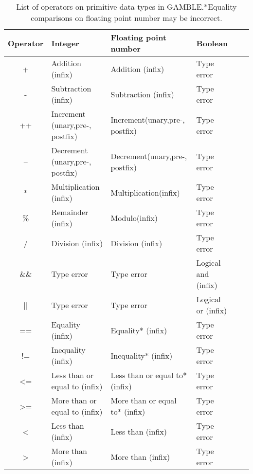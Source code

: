 \begin{table}[h]
    \centering
    \begin{tabular}{|c|l|l|l|l|l|}
    \hline
    \textbf{Operator}  & \textbf{Integer}                   & \textbf{Floating point number}    & \textbf{Boolean}       \\ \hline
    +                  & Addition (infix)                   & Addition (infix)                  & Type error             \\ \hline 
    -                  & Subtraction (infix)                & Subtraction (infix)               & Type error             \\ \hline 
    ++                 & Increment (unary,pre-, postfix)    & Increment(unary,pre-, postfix)    & Type error             \\ \hline    
    --                 & Decrement (unary,pre-, postfix)    & Decrement(unary,pre-, postfix)    & Type error             \\ \hline
    *                  & Multiplication (infix)             & Multiplication(infix)             & Type error             \\ \hline
    \%                 & Remainder (infix)                  & Modulo(infix)                     & Type error             \\ \hline
    /                  & Division (infix)                   & Division (infix)                  & Type error             \\ \hline
    \&\&               & Type error                         & Type error                        & Logical and (infix)    \\ \hline 
    ||                 & Type error                         & Type error                        & Logical or (infix)     \\ \hline 
    ==                 & Equality (infix)                   & Equality* (infix)                 & Type error             \\ \hline 
    !=                 & Inequality (infix)                 & Inequality* (infix)               & Type error             \\ \hline
    <=                 & Less than or equal to (infix)      & Less than or equal to* (infix)    & Type error             \\ \hline
    >=                 & More than or equal to (infix)      & More than or equal to* (infix)    & Type error             \\ \hline
    <                  & Less than (infix)                  & Less than (infix)                 & Type error             \\ \hline
    >                  & More than (infix)                  & More than (infix)                 & Type error             \\ \hline
    \end{tabular}
    \caption[List of operators on primitive data types in GAMBLE.]{List of operators on primitive data types in GAMBLE.\@*Equality comparisons on floating point number may be incorrect.}\label{tbl:operators}
\end{table}
\vspace{-20pt}